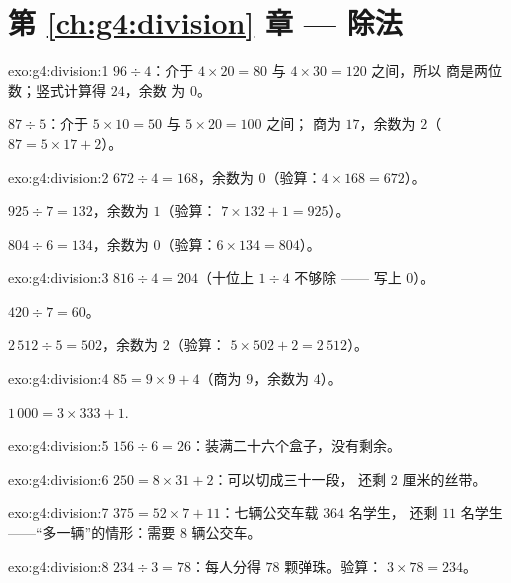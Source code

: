 \section*{第 \ref{ch:g4:division} 章 --- 除法}

\begin{solution}{exo:g4:division:1}
$96 \div 4$：介于 $4 \times 20 = 80$ 与 $4 \times 30 = 120$ 之间，所以
商是两位数；竖式计算得 $24$，余数
为 $0$。

$87 \div 5$：介于 $5 \times 10 = 50$ 与 $5 \times 20 = 100$ 之间；
商为 $17$，余数为 $2$（$87 = 5 \times 17 + 2$）。
\end{solution}

\begin{solution}{exo:g4:division:2}
$672 \div 4 = 168$，余数为 $0$（验算：$4 \times 168 = 672$）。

$925 \div 7 = 132$，余数为 $1$（验算：
$7 \times 132 + 1 = 925$）。

$804 \div 6 = 134$，余数为 $0$（验算：$6 \times 134 = 804$）。
\end{solution}

\begin{solution}{exo:g4:division:3}
$816 \div 4 = 204$（十位上 $1 \div 4$ 不够除 ——
写上 $0$）。

$420 \div 7 = 60$。

$2\,512 \div 5 = 502$，余数为 $2$（验算：
$5 \times 502 + 2 = 2\,512$）。
\end{solution}

\begin{solution}{exo:g4:division:4}
$85 = 9 \times 9 + 4$（商为 $9$，余数为 $4$）。

$1\,000 = 3 \times 333 + 1$.
\end{solution}

\begin{solution}{exo:g4:division:5}
$156 \div 6 = 26$：装满二十六个盒子，没有剩余。
\end{solution}

\begin{solution}{exo:g4:division:6}
$250 = 8 \times 31 + 2$：可以切成三十一段，
还剩 $2$ 厘米的丝带。
\end{solution}

\begin{solution}{exo:g4:division:7}
$375 = 52 \times 7 + 11$：七辆公交车载 $364$ 名学生，
还剩 $11$ 名学生——“多一辆”的情形：需要 $8$ 辆公交车。
\end{solution}

\begin{solution}{exo:g4:division:8}
$234 \div 3 = 78$：每人分得 $78$ 颗弹珠。验算：
$3 \times 78 = 234$。
\end{solution}

